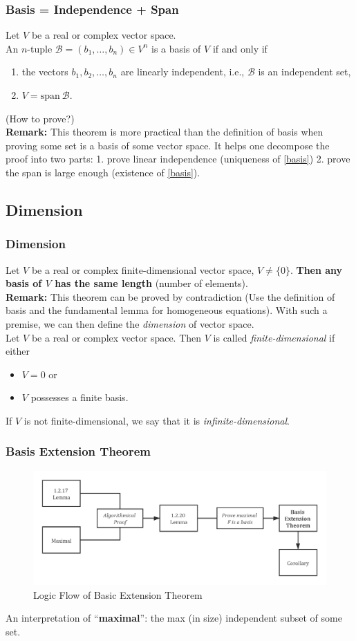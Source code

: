 \documentclass{beamer}
\renewcommand{\emph}[1]{{\color{Turquoise3}\textsl{#1}}}
\newcommand{\myseries}[2]{$#1_1,#1_2,\dots,#1_#2$}
\newcommand{\nullspace}{~\\[15pt]}
\begin{document}
\begin{frame}
    \frametitle{Basis = Independence + Span}
    Let $V$ be a real or complex vector space.\\ An $n$-tuple $\mathcal{B}=(b_1,\ldots,b_n)\in V^n$ is a basis of $V$ if and only if
    \begin{enumerate}
        \item the vectors \myseries{b}{n} are linearly independent, i.e., $\mathcal{B}$ is an independent set,
        \item $V=\text{span}~\mathcal{B}.$
    \end{enumerate}
    (How to prove?)
    \nullspace
    \textbf{Remark:} This theorem is more practical than the definition of basis when proving some set is a basis of some vector space. It helps one decompose the proof into two parts: 1. prove linear independence (uniqueness of \eqref{basis}) 2. prove the span is large enough (existence of \eqref{basis}).
\end{frame}

\subsection{Dimension}
\begin{frame}
    \frametitle{Dimension}
    Let $V$ be a real or complex finite-dimensional vector space, $V\neq\{0\}$. \textbf{Then any basis of $V$ has the same length }(number of elements).
    \nullspace
    \textbf{Remark:} This theorem can be proved by contradiction (Use the definition of basis and the fundamental lemma for homogeneous equations). With such a premise, we can then define the \emph{dimension} of vector space.
    \nullspace
    Let $V$ be a real or complex vector space. Then $V$ is called \emph{finite-dimensional} if either
    \begin{itemize}
        \item $V={0}$ or
        \item $V$ possesses a finite basis.
    \end{itemize}
    If $V$ is not finite-dimensional, we say that it is \emph{infinite-dimensional}.
\end{frame}

\begin{frame}
    \frametitle{Basis Extension Theorem}
    \begin{figure}[H]
        \centering
        \includegraphics[width=\textwidth]{chart1.png}
        \caption{Logic Flow of Basic Extension Theorem}
        \label{fig:bet}
    \end{figure}
    An interpretation of ``\textbf{maximal}'': the max (in size) independent subset of some set.
\end{frame}
\end{document}
